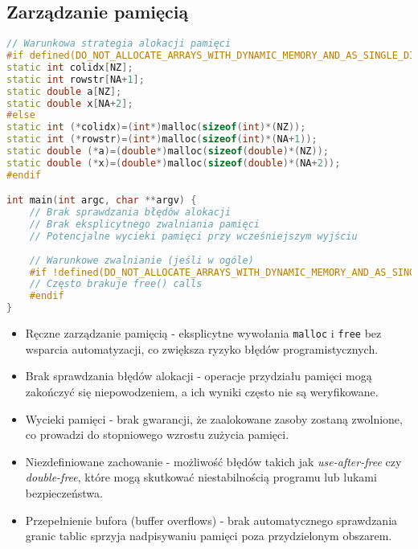 \subsection{Zarządzanie pamięcią}
\begin{lstlisting}[language=C++, caption={Zarządzanie pamięcią w benchmarkach C++ z OpenMP}, label={lst:openmp_memory}]
// Warunkowa strategia alokacji pamięci
#if defined(DO_NOT_ALLOCATE_ARRAYS_WITH_DYNAMIC_MEMORY_AND_AS_SINGLE_DIMENSION)
static int colidx[NZ];
static int rowstr[NA+1];
static double a[NZ];
static double x[NA+2];
#else
static int (*colidx)=(int*)malloc(sizeof(int)*(NZ));
static int (*rowstr)=(int*)malloc(sizeof(int)*(NA+1));
static double (*a)=(double*)malloc(sizeof(double)*(NZ));
static double (*x)=(double*)malloc(sizeof(double)*(NA+2));
#endif

int main(int argc, char **argv) {
    // Brak sprawdzania błędów alokacji
    // Brak eksplicytnego zwalniania pamięci
    // Potencjalne wycieki pamięci przy wcześniejszym wyjściu
    
    // Warunkowe zwalnianie (jeśli w ogóle)
    #if !defined(DO_NOT_ALLOCATE_ARRAYS_WITH_DYNAMIC_MEMORY_AND_AS_SINGLE_DIMENSION)
    // Często brakuje free() calls
    #endif
}
\end{lstlisting}
\begin{itemize}
    \item Ręczne zarządzanie pamięcią - eksplicytne wywołania \texttt{malloc} i \texttt{free} bez wsparcia automatyzacji, co zwiększa ryzyko błędów programistycznych.
    
    \item Brak sprawdzania błędów alokacji - operacje przydziału pamięci mogą zakończyć się niepowodzeniem, a ich wyniki często nie są weryfikowane.
    
    \item Wycieki pamięci - brak gwarancji, że zaalokowane zasoby zostaną zwolnione, co prowadzi do stopniowego wzrostu zużycia pamięci.
    
    \item Niezdefiniowane zachowanie - możliwość błędów takich jak \textit{use-after-free} czy \textit{double-free}, które mogą skutkować niestabilnością programu lub lukami bezpieczeństwa.
    
    \item Przepełnienie bufora (buffer overflows) - brak automatycznego sprawdzania granic tablic sprzyja nadpisywaniu pamięci poza przydzielonym obszarem.
\end{itemize}
  
